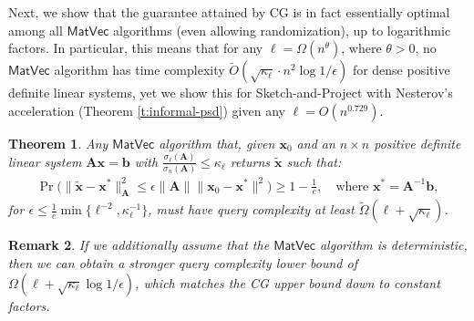 \documentclass[11pt]{article}
\def\x{{\mathbf x}}
\def\MatVec{{\mathsf{MatVec}}}
\def\b{{\mathbf b}}
\def\A{{\mathbf A}}
\newtheorem{thm}{Theorem}
\newtheorem{remark}[thm]{Remark}
\begin{document}
Next, we show that the guarantee attained by CG is in fact essentially optimal among all $\MatVec$ algorithms (even allowing randomization), up to logarithmic factors. In particular, this means that for any $\ell=\Omega(n^\theta)$, where $\theta>0$, no $\MatVec$ algorithm has time complexity $\tilde O(\sqrt{\kappa_\ell}\cdot n^2\log1/\epsilon)$ for dense positive definite linear systems, yet we show this for Sketch-and-Project with Nesterov's acceleration (Theorem \ref{t:informal-psd}) given any $\ell = O(n^{0.729})$.
\begin{thm}\label{t:lower}
    Any $\MatVec$ algorithm that, given $\x_0$ and an $n\times n$ positive definite linear system $\A\x=\b$ with $\frac{\sigma_{\ell}(\A)}{\sigma_{n}(\A)}\leq \kappa_\ell$ returns $\tilde\x$ such that:
    \begin{align*}
    \Pr\Big(\|\tilde\x - \x^*\|^2_{\A}\leq \epsilon\|\A\|\|\x_0-\x^*\|^2\Big)\geq 1- \frac1e,\quad\text{where }\x^*=\A^{-1}\b,
    \end{align*}
for $\epsilon\leq \frac1e\min\{\ell^{-2},\kappa_\ell^{-1}\}$, must have query complexity at least $\tilde\Omega(\ell + \sqrt{\kappa_\ell})$.
\end{thm}
\begin{remark}\label{r:lower}
    If we additionally assume that the $\MatVec$ algorithm is deterministic, then we can obtain a stronger query complexity lower bound of $\Omega(\ell + \sqrt{\kappa_\ell}\log1/\epsilon)$, which matches the CG upper bound down to constant factors.
\end{remark}
\end{document}
